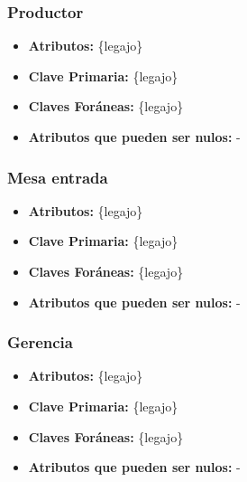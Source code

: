 \documentclass[a4paper,11pt]{article}
\begin{document}
\subsubsection{Productor}

\begin{itemize}

	\item \textbf{Atributos:} \{legajo\}
	
	\item \textbf{Clave Primaria:} \{legajo\}
	
	\item \textbf{Claves Foráneas:} \{legajo\}
	
	\item \textbf{Atributos que pueden ser nulos:} -
	
\end{itemize}

\subsubsection{Mesa entrada}

\begin{itemize}

	\item \textbf{Atributos:} \{legajo\}
	
	\item \textbf{Clave Primaria:} \{legajo\}
	
	\item \textbf{Claves Foráneas:} \{legajo\}
	
	\item \textbf{Atributos que pueden ser nulos:} -
	
\end{itemize}

\subsubsection{Gerencia}

\begin{itemize}

	\item \textbf{Atributos:} \{legajo\}
	
	\item \textbf{Clave Primaria:} \{legajo\}
	
	\item \textbf{Claves Foráneas:} \{legajo\}
	
	\item \textbf{Atributos que pueden ser nulos:} -
	
\end{itemize}
\end{document}
